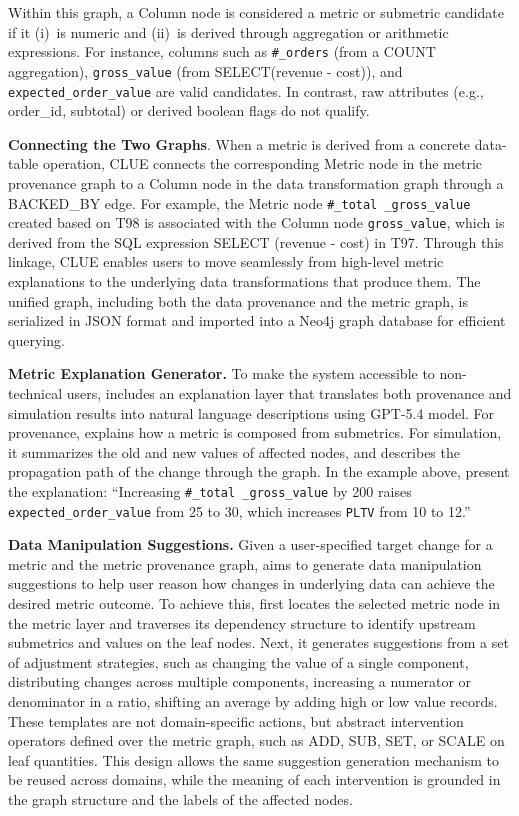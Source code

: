 Within this graph, a Column node is considered a metric or submetric candidate
if it (i)~is numeric and (ii)~is derived through aggregation or arithmetic
expressions. For instance, columns such as \texttt{\#\_orders} (from a COUNT
aggregation), \texttt{gross\_value} (from SELECT(revenue - cost)), and
\texttt{expected\_order\_value} are valid candidates. In contrast, raw
attributes (e.g., order\_id, subtotal) or derived boolean flags do not qualify.

\noindent \textbf{Connecting the Two Graphs}. When a metric is derived from a
concrete data-table operation, CLUE connects the corresponding Metric node in
the metric provenance graph to a Column node in the data transformation graph
through a BACKED\_BY edge. For example, the Metric node \texttt{\#\_total
\_gross\_value} created based on T98 is associated with the Column node
\texttt{gross\_value}, which is derived from the SQL expression SELECT (revenue
- cost) in T97. Through this linkage, CLUE enables users to move seamlessly from
high-level metric explanations to the underlying data transformations that
produce them. The unified graph, including both the data provenance and the
metric graph, is serialized in JSON format and imported into a Neo4j graph
database for efficient querying.

\noindent \textbf{Metric Explanation Generator.} To make the system accessible
to non-technical users, \clue includes an explanation layer that translates both
provenance and simulation results into natural language descriptions using
GPT-5.4 model. For provenance, \clue explains how a metric is composed from
submetrics. For simulation, it summarizes the old and new values of affected
nodes, and describes the propagation path of the change through the graph. In
the example above, \clue present the explanation: ``Increasing \texttt{\#\_total
\_gross\_value} by 200 raises \texttt{expected\_order\_value} from 25 to 30,
which increases \texttt{PLTV} from 10 to 12.''

\noindent \textbf{Data Manipulation Suggestions.} Given a user-specified target
change for a metric and the metric provenance graph, \clue aims to generate data
manipulation suggestions to help user reason how changes in underlying data can
achieve the desired metric outcome. To achieve this, \clue first locates the
selected metric node in the metric layer and traverses its dependency structure
to identify upstream submetrics and values on the leaf nodes. Next, it generates
suggestions from a set of adjustment strategies, such as changing the value of a
single component, distributing changes across multiple components, increasing a
numerator or denominator in a ratio, shifting an average by adding high or low
value records. These templates are not domain-specific actions, but abstract
intervention operators defined over the metric graph, such as ADD, SUB, SET, or
SCALE on leaf quantities. This design allows the same suggestion generation
mechanism to be reused across domains, while the meaning of each intervention is
grounded in the graph structure and the labels of the affected nodes.

